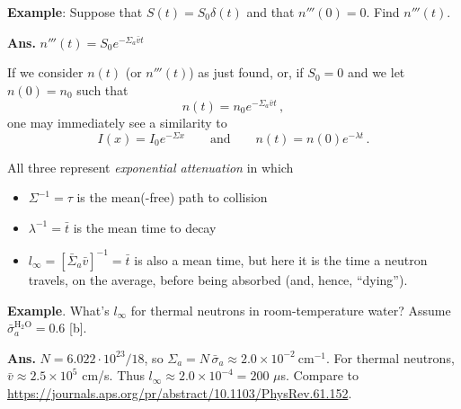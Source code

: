 \documentclass[compact]{ne630handout}
\begin{document}
\begin{handoutflow}
{\bf Example}: Suppose that $S(t) = S_0 \delta(t)$ and that $n'''(0) = 0$. Find $n'''(t)$.



\textcolor{wcprimary}{{\small
{\bf Ans.}
$n'''(t) = S_0 e^{-\Sigma_a \bar{v} t}$
}}




If we consider $n(t)$ (or $n'''(t)$) as just found, or, if $S_0 = 0$ and we let $n(0) = n_0$ such that
\begin{equation*}
 n(t) = n_0 e^{-\Sigma_a \bar{v} t} \, ,
\end{equation*}
one may immediately see a similarity to
\begin{equation*}
    I(x) = I_0 e^{-\Sigma x} \qquad \text{and} \qquad n(t) = n(0) e^{-\lambda t} \, .
\end{equation*}

All three represent {\it exponential attenuation} in which
\begin{itemize}
 \item $\Sigma^{-1} = \tau$ is the mean(-free) path to collision
 \item $\lambda^{-1} = \bar{t}$ is the mean time to decay

 \item  $\boxed{l_{\infty} = [\bar{\Sigma}_a \bar{v}]^{-1} = \bar{t}}$ is also a mean time, but here it is the time a neutron travels, on the average, before being absorbed (and, hence, ``dying'').
\end{itemize}

{\bf Example}. What's $l_{\infty}$ for thermal neutrons in room-temperature water?  Assume $\bar{\sigma}^{\text{H}_2\text{O}}_a = 0.6$ [b].

\textcolor{wcprimary}{{\small
{\bf Ans.}
$N=6.022\cdot 10^{23}/18$, so $\Sigma_a = N\,\bar\sigma_a \approx 2.0\times10^{-2}\ \text{cm}^{-1}$.  For thermal neutrons, $\bar{v}\approx2.5\times10^5$ cm/s.  Thus $l_{\infty} \approx 2.0\times10^{-4} = 200$ $\mu$s.  Compare to  \url{https://journals.aps.org/pr/abstract/10.1103/PhysRev.61.152}.
}}

\end{handoutflow}
\end{document}
